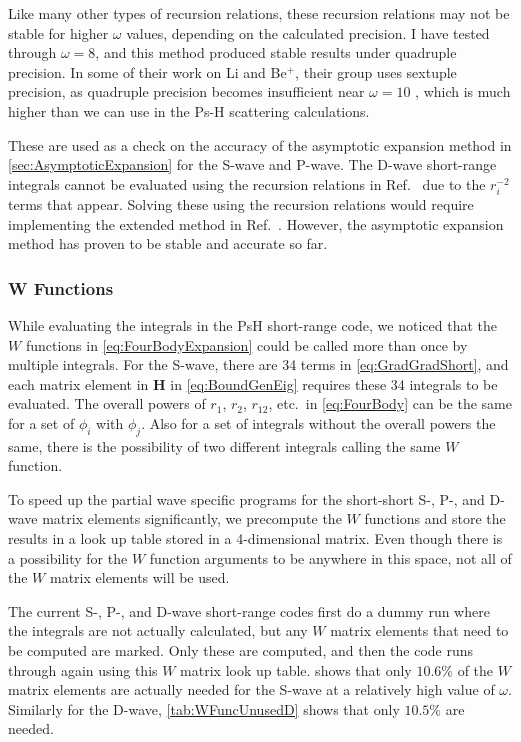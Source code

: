 \documentclass[Dissertation.tex]{subfiles}
\begin{document}
Like many other types of recursion relations, these recursion relations may 
not be stable for higher $\omega$ values, depending on the calculated 
precision. I have tested through $\omega = 8$, and this method produced 
stable results under quadruple precision. In some of their work on Li and
Be$^+$, their group uses sextuple precision, as quadruple precision becomes 
insufficient near $\omega = 10$ \cite{Puchalski2006}, which is much higher 
than we can use in the Ps-H scattering calculations.

These are used as a check on the accuracy of the asymptotic expansion method in
\cref{sec:AsymptoticExpansion} for the S-wave and P-wave. The D-wave short-range
integrals cannot be evaluated using the recursion relations in
Ref.~\cite{Pachucki2004} due to the $r_i^{-2}$ terms that appear. Solving these
using the recursion relations would require implementing the extended method in
Ref.~\cite{Pachucki2005}. However, the asymptotic expansion method has proven
to be stable and accurate so far.


\subsubsection{W Functions}
\label{sec:WFunctions}

While evaluating the integrals in the PsH short-range code, we noticed that the
$W$ functions in \cref{eq:FourBodyExpansion} could be called more than once by
multiple integrals. For the S-wave, there are 34 terms in \cref{eq:GradGradShort},
and each matrix element in \textbf{H} in \cref{eq:BoundGenEig} requires these 34
integrals to be evaluated. The overall powers of $r_1$, $r_2$, $r_{12}$, etc.\ in
\cref{eq:FourBody} can be the same for a set of $\phi_i$ with $\phi_j$. Also for a
set of integrals without the overall powers the same, there is the possibility of
two different integrals calling the same $W$ function.

To speed up the partial wave specific programs for the short-short
S-, P-, and D-wave matrix elements significantly, we precompute the $W$ functions
and store the results in a look up table stored in a 4-dimensional matrix.
Even though there is a possibility for the $W$ function arguments to be
anywhere in this space, not all of the $W$ matrix elements will be used.

The current S-, P-, and D-wave short-range codes first do a dummy run
where the integrals are not actually calculated, but any $W$ matrix elements
that need to be computed are marked. Only these are computed, and then the code
runs through again using this $W$ matrix look up table. 
shows that only $10.6\%$ of the $W$ matrix elements are actually needed for the
S-wave at a relatively high value of $\omega$. Similarly for the D-wave,
\cref{tab:WFuncUnusedD} shows that only $10.5\%$ are needed.
\end{document}
